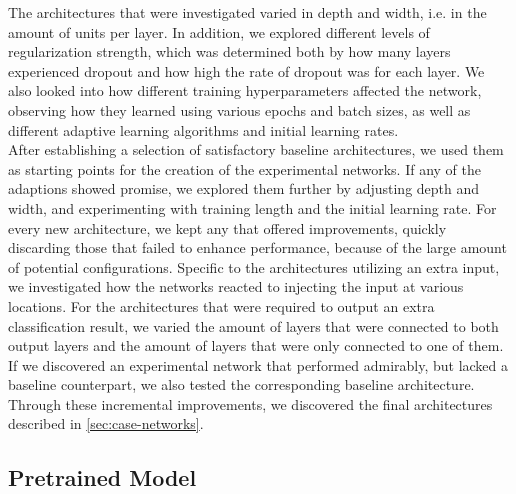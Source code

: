 \noindent The architectures that were investigated varied in depth and width, i.e. in the amount of units per layer. In addition, we explored different levels of regularization strength, which was determined both by how many layers experienced dropout and how high the rate of dropout was for each layer. We also looked into how different training hyperparameters affected the network, observing how they learned using various epochs and batch sizes, as well as different adaptive learning algorithms and initial learning rates. \\

\noindent After establishing a selection of satisfactory baseline architectures, we used them as starting points for the creation of the experimental networks. If any of the adaptions showed promise, we explored them further by adjusting depth and width, and experimenting with training length and the initial learning rate. For every new architecture, we kept any that offered improvements, quickly discarding those that failed to enhance performance, because of the large amount of potential configurations. Specific to the architectures utilizing an extra input, we investigated how the networks reacted to injecting the input at various locations. For the architectures that were required to output an extra classification result, we varied the amount of layers that were connected to both output layers and the amount of layers that were only connected to one of them. If we discovered an experimental network that performed admirably, but lacked a baseline counterpart, we also tested the corresponding baseline architecture. Through these incremental improvements, we discovered the final architectures described in \autoref{sec:case-networks}. 

\subsection{Pretrained Model}



